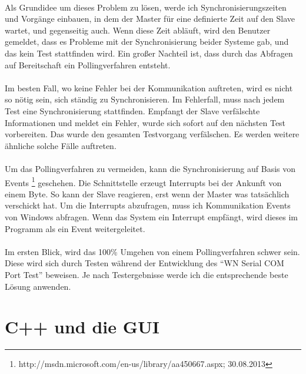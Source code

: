 \paragraph{}
Als Grundidee um dieses Problem zu lösen, werde ich Synchronisierungszeiten und Vorgänge einbauen, in dem der Master für eine definierte Zeit auf den Slave wartet, und gegenseitig auch. Wenn diese Zeit abläuft, wird den Benutzer gemeldet, dass es Probleme mit der Synchronisierung beider Systeme gab, und das kein Test stattfinden wird. Ein großer Nachteil ist, dass durch das Abfragen auf Bereitschaft ein Pollingverfahren entsteht. 

\paragraph{}
Im besten Fall, wo keine Fehler bei der Kommunikation auftreten, wird es nicht so nötig sein, sich ständig zu Synchronisieren. Im Fehlerfall, muss nach jedem Test eine Synchronisierung stattfinden. Empfangt der Slave verfälschte Informationen und meldet ein Fehler, wurde sich sofort auf den nächsten Test vorbereiten. Das wurde den gesamten Testvorgang verfälschen. Es werden weitere ähnliche solche Fälle auftreten.

\paragraph{}
Um das Pollingverfahren zu vermeiden, kann die Synchronisierung auf Basis von Events \footnote{http://msdn.microsoft.com/en-us/library/aa450667.aspx; 30.08.2013} geschehen. Die Schnittstelle erzeugt Interrupts bei der Ankunft von einem Byte. So kann der Slave reagieren, erst wenn der Master was tatsächlich verschickt hat. Um die Interrupts abzufragen, muss ich Kommunikation Events von Windows abfragen. Wenn das System ein Interrupt empfängt, wird dieses im Programm als ein Event weitergeleitet.

\paragraph{}
Im ersten Blick, wird das 100\% Umgehen von einem Pollingverfahren schwer sein. Diese wird sich durch Testen während der Entwicklung des "`WN Serial COM Port Test"' beweisen. Je nach Testergebnisse werde ich die entsprechende beste Lösung anwenden.



\section{C++ und die GUI}
